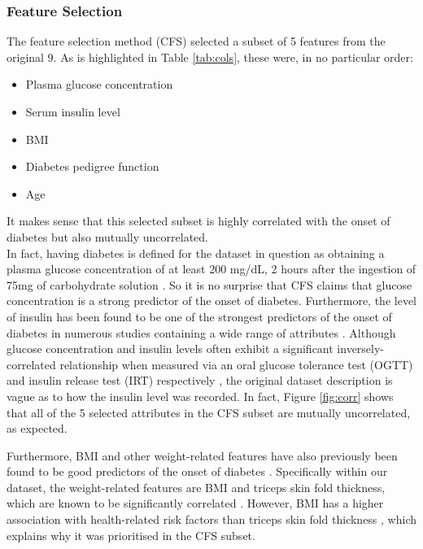 \subsubsection{Feature Selection}


The feature selection method (CFS) selected a subset of 5 features from the original 9. As is highlighted in Table \ref{tab:cols}, these were, in no particular order:

\begin{itemize}
    \item Plasma glucose concentration
    \item Serum insulin level
    \item BMI
    \item Diabetes pedigree function
    \item Age
\end{itemize}

It makes sense that this selected subset is highly correlated with the onset of diabetes but also mutually uncorrelated. \\

In fact, having diabetes is defined for the dataset in question as obtaining a plasma glucose concentration of at least 200 mg/dL, 2 hours after the ingestion of 75mg of carbohydrate solution \cite{pima}. So it is no surprise that CFS claims that glucose concentration is a strong predictor of the onset of diabetes. Furthermore, the level of insulin has been found to be one of the strongest predictors of the onset of diabetes in numerous studies containing a wide range of attributes \cite{a}\cite{b}\cite{c}\cite{d}. Although glucose concentration and insulin levels often exhibit a significant inversely-correlated relationship when measured via an oral glucose tolerance test (OGTT) and insulin release test (IRT) respectively \cite{e}, the original dataset description is vague as to how the insulin level was recorded. In fact, Figure \ref{fig:corr} shows that all of the 5 selected attributes in the CFS subset are mutually uncorrelated, as expected.

Furthermore, BMI and other weight-related features have also previously been found to be good predictors of the onset of diabetes \cite{a}\cite{c}\cite{d}. Specifically within our dataset, the weight-related features are BMI and triceps skin fold thickness, which are known to be significantly correlated \cite{f}. However, BMI has a higher association with health-related risk factors than triceps skin fold thickness \cite{g}\cite{h}, which explains why it was prioritised in the CFS subset.

